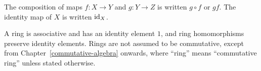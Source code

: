 \begin{notation}\label{introduction:notation-maps}
The composition of maps $f \colon X \to Y$ and $g \colon Y \to Z$ is written
$g \circ f$ or $gf$. The identity map of $X$ is written $\mathrm{id}_X$.
\end{notation}

\begin{notation}\label{introduction:notation-rings}
A ring is associative and has an identity element $1$, and ring homomorphisms
preserve identity elements. Rings are not assumed to be commutative, except
from Chapter~\ref{commutative-algebra} onwards, where ``ring'' means
``commutative ring'' unless stated otherwise.
\end{notation}
